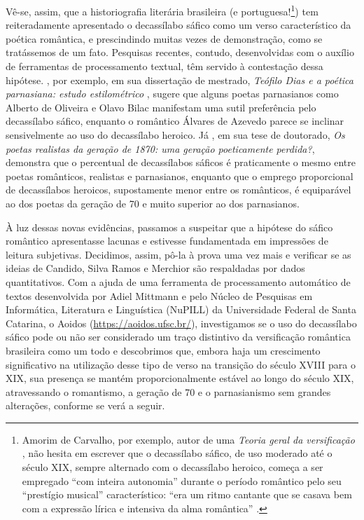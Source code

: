 \documentclass[portuguese]{textolivre}
\begin{document}
Vê-se, assim, que a historiografia literária brasileira (e portuguesa!\footnote{Amorim de Carvalho, por exemplo, autor de uma \textit{Teoria geral da versificação} \cite{carvalho1987teoria}, não hesita em escrever que o decassílabo sáfico, de uso moderado até o século XIX, sempre alternado com o decassílabo heroico, começa a ser empregado “com inteira autonomia” durante o período romântico pelo seu “prestígio musical” característico: “era um ritmo cantante que se casava bem com a expressão lírica e intensiva da alma romântica” \cite[p.~286]{carvalho1987teoria}.}) tem reiteradamente apresentado o decassílabo sáfico como um verso característico da poética romântica, e prescindindo muitas vezes de demonstração, como se tratássemos de um fato. Pesquisas recentes, contudo, desenvolvidas com o auxílio de ferramentas de processamento textual, têm servido à contestação dessa hipótese. \textcite{sousa2023teofilo}, por exemplo, em sua dissertação de mestrado, \textit{Teófilo Dias e a poética parnasiana: estudo estilométrico} \cite[p.~100]{sousa2023teofilo}, sugere que alguns poetas parnasianos como Alberto de Oliveira e Olavo Bilac manifestam uma sutil preferência pelo decassílabo sáfico, enquanto o romântico Álvares de Azevedo parece se inclinar sensivelmente ao uso do decassílabo heroico. Já \textcite{scarabelot2024poetas}, em sua tese de doutorado, \textit{Os poetas realistas da geração de 1870: uma geração poeticamente perdida?}, demonstra que o percentual de decassílabos sáficos é praticamente o mesmo entre poetas românticos, realistas e parnasianos, enquanto que o emprego proporcional de decassílabos heroicos, supostamente menor entre os românticos, é equiparável ao dos poetas da geração de 70 e muito superior ao dos parnasianos.

À luz dessas novas evidências, passamos a suspeitar que a hipótese do sáfico romântico apresentasse lacunas e estivesse fundamentada em impressões de leitura subjetivas. Decidimos, assim, pô-la à prova uma vez mais e verificar se as ideias de Candido, Silva Ramos e Merchior são respaldadas por dados quantitativos. Com a ajuda de uma ferramenta de processamento automático de textos desenvolvida por Adiel Mittmann e pelo Núcleo de Pesquisas em Informática, Literatura e Linguística (NuPILL) da Universidade Federal de Santa Catarina, o Aoidos (\url{https://aoidos.ufsc.br/}), investigamos se o uso do decassílabo sáfico pode ou não ser considerado um traço distintivo da versificação romântica brasileira como um todo e descobrimos que, embora haja um crescimento significativo na utilização desse tipo de verso na transição do século XVIII para o XIX, sua presença se mantém proporcionalmente estável ao longo do século XIX, atravessando o romantismo, a geração de 70 e o parnasianismo sem grandes alterações, conforme se verá a seguir.
\end{document}

